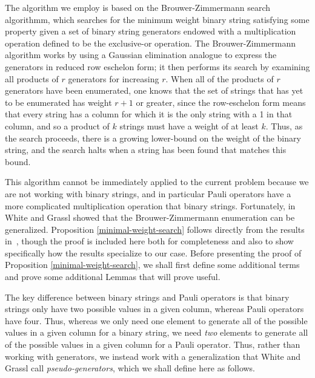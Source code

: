\documentclass[twocolumn,showpacs,preprintnumbers,amsmath,amssymb,nofootinbib,pra,floatfix]{revtex4-1}
\newenvironment{remark}[1][Remark]{\begin{trivlist}
\item[\hskip \labelsep {\bfseries #1}]}{\end{trivlist}}
\begin{document}
\begin{remark}
The algorithm we employ is based on the Brouwer-Zimmermann search algorithmm, which searches for the minimum weight binary string satisfying some property given a set of binary string generators endowed with a multiplication operation defined to be the exclusive-or operation.  The Brouwer-Zimmermann algorithm works by using a Gaussian elimination analogue to express the generators in reduced row eschelon form;  it then performs its search by examining all products of $r$ generators for increasing $r$.  When all of the products of $r$ generators have been enumerated, one knows that the set of strings that has yet to be enumerated has weight $r+1$ or greater, since the row-eschelon form means that every string has a column for which it is the only string with a 1 in that column, and so a product of $k$ strings must have a weight of at least $k$.  Thus, as the search proceeds, there is a growing lower-bound on the weight of the binary string, and the search halts when a string has been found that matches this bound.

This algorithm cannot be immediately applied to the current problem because we are not working with binary strings, and in particular Pauli operators have a more complicated multiplication operation that binary strings.  Fortunately, in~\cite{White:2006fj} White and Grassl showed that the Brouwer-Zimmermann enumeration can be generalized.  Proposition \ref{minimal-weight-search} follows directly from the results in~\cite{White:2006fj}, though the proof is included here both for completeness and also to show specifically how the results specialize to our case.  Before presenting the proof of Proposition \ref{minimal-weight-search}, we shall first define some additional terms and prove some additional Lemmas that will prove useful.

The key difference between binary strings and Pauli operators is that binary strings only have two possible values in a given column, whereas Pauli operators have four.  Thus, whereas we only need one element to generate all of the possible values in a given column for a binary string, we need \emph{two} elements to generate all of the possible values in a given column for a Pauli operator.  Thus, rather than working with generators, we instead work with a generalization that White and Grassl call \emph{pseudo-generators}, which we shall define here as follows.
\end{remark}
\end{document}
